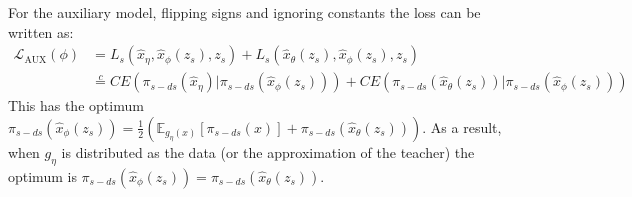 For the auxiliary model, flipping signs and ignoring constants the loss can be written as:
\begin{align}
     \mathcal{L}_{\text{AUX}}(\phi) &= L_s(\hat{x}_\eta, \hat{x}_\phi(z_s), z_s) + L_s(\hat{x}_\theta(z_s), \hat{x}_\phi(z_s), z_s) \\
     &\stackrel{c}{=} CE(\pi_{s-ds}(\hat{x}_\eta) | \pi_{s-ds}(\hat{x}_\phi(z_s))) + CE(\pi_{s-ds}(\hat{x}_\theta(z_s)) | \pi_{s-ds}(\hat{x}_\phi(z_s)))
\end{align}
This has the optimum $\pi_{s-ds}(\hat{x}_\phi(z_s)) = \frac{1}{2}\left(\mathbb{E}_{g_\eta(x)}[\pi_{s-ds}(x)] + \pi_{s-ds}(\hat{x}_\theta(z_s))\right)$. As a result, when $g_\eta$ is distributed as the data (or the approximation of the teacher) the optimum is $\pi_{s-ds}(\hat{x}_\phi(z_s)) = \pi_{s-ds}(\hat{x}_\theta(z_s))$.
